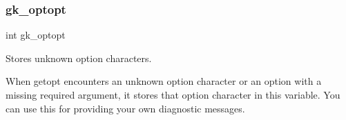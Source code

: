 \subsubsection{\texorpdfstring{gk\+\_\+optopt}{gk\_optopt}}
{\footnotesize\ttfamily int gk\+\_\+optopt}



Stores unknown option characters. 

When getopt encounters an unknown option character or an option with a missing required argument, it stores that option character in this variable. You can use this for providing your own diagnostic messages. 